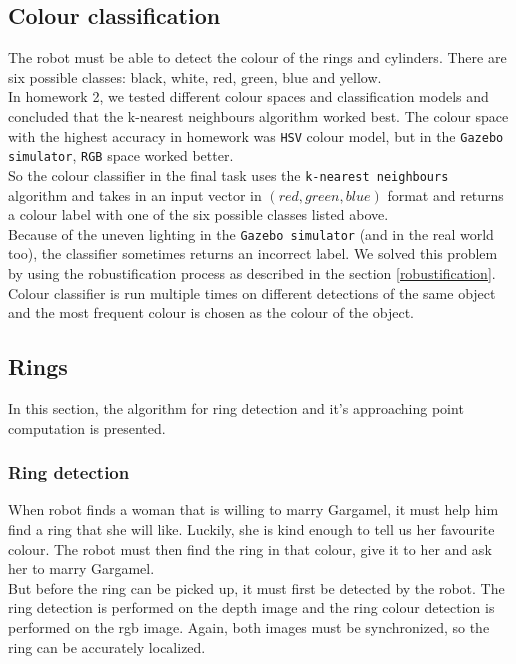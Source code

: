 \documentclass[12pt,a4paper]{article}
\begin{document}
	\subsection{Colour classification} \label{colour_classification}
	The robot must be able to detect the colour of the rings and cylinders. There are six possible classes: black, white, red, green, blue and yellow. \\
	
	In homework 2, we tested different colour spaces and classification models and concluded that the k-nearest neighbours algorithm worked best. The colour space with the highest accuracy in homework was \texttt{HSV} colour model, but in the \texttt{Gazebo simulator}, \texttt{RGB} space worked better. \\
	
	So the colour classifier in the final task uses the \texttt{k-nearest neighbours} algorithm and takes in an input vector in $(red, green, blue)$ format and returns a colour label with one of the six possible classes listed above. \\
	
	Because of the uneven lighting in the \texttt{Gazebo simulator} (and in the real world too), the classifier sometimes returns an incorrect label. We solved this problem by using the robustification process as described in the section \ref{robustification}. Colour classifier is run multiple times on different detections of the same object and the most frequent colour is chosen as the colour of the object. \\
	
	\subsection{Rings}
	In this section, the algorithm for ring detection and it's approaching point computation is presented.
	
	\subsubsection{Ring detection} \label{ring_detection}
	When robot finds a woman that is willing to marry Gargamel, it must help him find a ring that she will like. Luckily, she is kind enough to tell us her favourite colour. The robot must then find the ring in that colour, give it to her and ask her to marry Gargamel. \\
	
	But before the ring can be picked up, it must first be detected by the robot. The ring detection is performed on the depth image and the ring colour detection is performed on the rgb image. Again, both images must be synchronized, so the ring can be accurately localized. \\
	
\end{document}
